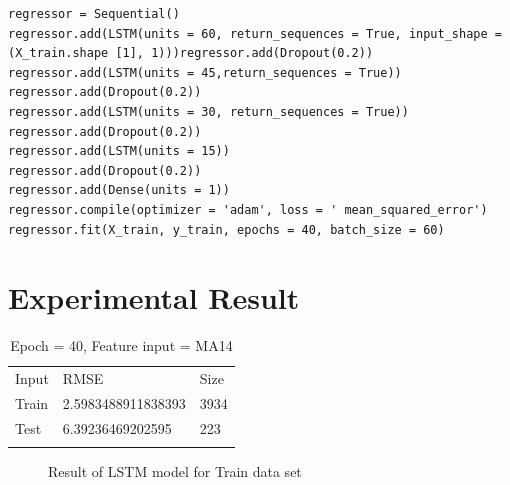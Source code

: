 \documentclass[5p,,preprint,12pt,twocolumn]{elsarticle}
\makeatletter
\def\tblbottomrule{\noalign{\vspace*{6pt}}\hline\noalign{\vspace*{2pt}}}
\def\tblmidrule{\noalign{\vspace*{6pt}}\hline\noalign{\vspace*{2pt}}}
\def\fixFloatSize#1{}%
\makeatother
\begin{document}
\begin{lstlisting}[style=listing_style,caption={Code for LSTM Neural Network}]
regressor = Sequential() 
regressor.add(LSTM(units = 60, return_sequences = True, input_shape =(X_train.shape [1], 1)))regressor.add(Dropout(0.2)) 
regressor.add(LSTM(units = 45,return_sequences = True)) regressor.add(Dropout(0.2)) 
regressor.add(LSTM(units = 30, return_sequences = True)) 
regressor.add(Dropout(0.2))
regressor.add(LSTM(units = 15))
regressor.add(Dropout(0.2)) 
regressor.add(Dense(units = 1)) 
regressor.compile(optimizer = 'adam', loss = ' mean_squared_error')
regressor.fit(X_train, y_train, epochs = 40, batch_size = 60)
\end{lstlisting}

    
\section{Experimental Result}

\begin{table}[!htbp]
\caption{{Epoch = 40, Feature input = MA14} }
\label{tw-8df77355ef45}
\def\arraystretch{1}
\ignorespaces 
\centering 
\begin{tabulary}{\linewidth}{LLL}
\hline 
Input & RMSE & Size\\
\tblmidrule 
Train &
  2.5983488911838393 &
  3934\\
Test &
  6.39236469202595 &
  223\\
\tblbottomrule 
\end{tabulary}\par 
\end{table}

\bgroup
\fixFloatSize{images/013c96e3-f6d4-433f-9be4-b3eda43dec93-u95-5-ma14-nflx-40-e-train.png}
\begin{figure}[!htbp]
\centering \makeatletter{}
\makeatother 
\caption{{Result of LSTM model for Train data set}}
\label{f-dd2f0d7b37b6}
\end{figure}
\egroup
\end{document}
